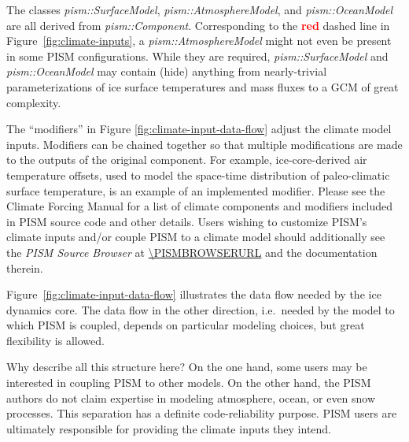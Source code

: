 The classes \mbox{\emph{pism::SurfaceModel}}, \mbox{\emph{pism::AtmosphereModel}}, and \mbox{\emph{pism::OceanModel}} are all derived from \mbox{\emph{pism::Component}}.  Corresponding to the \textcolor{red}{\textbf{red}} dashed line in Figure~\ref{fig:climate-inputs}, a \mbox{\emph{pism::AtmosphereModel}} might not even be present in some PISM configurations.  While they are required, \emph{pism::SurfaceModel} and \emph{pism::OceanModel} may contain (hide) anything from nearly-trivial parameterizations of ice surface temperatures and mass fluxes to a GCM of great complexity.  

The ``modifiers'' in Figure \ref{fig:climate-input-data-flow} adjust the
climate model inputs.  Modifiers can be chained together so that multiple modifications
are made to the outputs of the original component.  For example,
ice-core-derived air temperature offsets, used to model the space-time
distribution of paleo-climatic surface temperature, is an example of an
implemented modifier.  Please see the Climate Forcing Manual for
a list of climate components and modifiers included in PISM source code and other details.
Users wishing to customize PISM's climate inputs and/or couple PISM to a climate
model should additionally see the \emph{PISM Source Browser} at \url{\PISMBROWSERURL}
and the documentation therein.

Figure~\ref{fig:climate-input-data-flow} illustrates the data flow needed
by the ice dynamics core.  The data flow in the other direction, i.e.~needed by the
model to which PISM is coupled, depends on particular modeling choices, but
great flexibility is allowed.

Why describe all this structure here?  On the one hand, some users may be interested
in coupling PISM to other models.  On the other hand, the PISM authors do not
claim expertise in modeling atmosphere, ocean, or even snow processes.  This
separation has a definite code-reliability purpose.  PISM users
are ultimately responsible for providing the climate inputs they intend.
